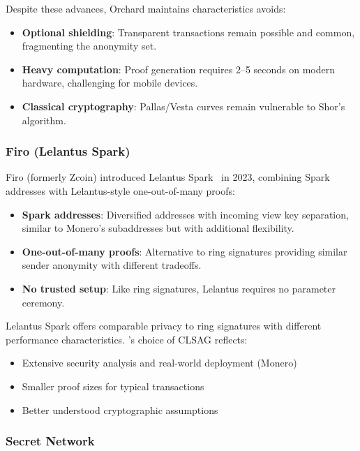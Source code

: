 Despite these advances, Orchard maintains characteristics \Botho avoids:
\begin{itemize}
  \item \textbf{Optional shielding}: Transparent transactions remain possible
    and common, fragmenting the anonymity set.
  \item \textbf{Heavy computation}: Proof generation requires 2--5 seconds on
    modern hardware, challenging for mobile devices.
  \item \textbf{Classical cryptography}: Pallas/Vesta curves remain
    vulnerable to Shor's algorithm.
\end{itemize}

\subsubsection{Firo (Lelantus Spark)}

Firo (formerly Zcoin) introduced Lelantus Spark~\cite{spark} in 2023,
combining Spark addresses with Lelantus-style one-out-of-many proofs:

\begin{itemize}
  \item \textbf{Spark addresses}: Diversified addresses with incoming view
    key separation, similar to Monero's subaddresses but with additional
    flexibility.
  \item \textbf{One-out-of-many proofs}: Alternative to ring signatures
    providing similar sender anonymity with different tradeoffs.
  \item \textbf{No trusted setup}: Like ring signatures, Lelantus requires
    no parameter ceremony.
\end{itemize}

Lelantus Spark offers comparable privacy to ring signatures with different
performance characteristics. \Botho's choice of CLSAG reflects:
\begin{itemize}
  \item Extensive security analysis and real-world deployment (Monero)
  \item Smaller proof sizes for typical transactions
  \item Better understood cryptographic assumptions
\end{itemize}

\subsubsection{Secret Network}

